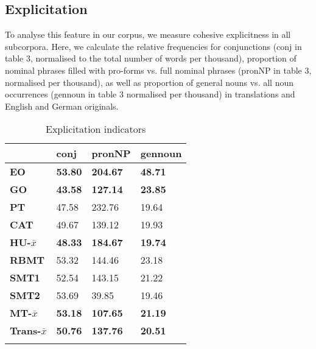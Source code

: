 \documentclass[output=paper]{LSP/langsci}
\begin{document}
\subsection{Explicitation}

To analyse this feature in our corpus, we measure cohesive explicitness in all subcorpora. Here, we calculate the relative frequencies for conjunctions (conj in table 3, normalised to the total number of words per thousand), proportion of nominal phrases filled with pro-forms vs. full nominal phrases (pronNP in table 3, normalised per thousand), as well as proportion of general nouns vs. all noun occurrences (gennoun in table 3 normalised per thousand) in translations and English and German originals.

\begin{table}
     \centering
     \begin{tabular}{llll}
\lsptoprule
              & \textbf{conj}         & \textbf{pronNP}  & \textbf{gennoun} \\ \midrule
\textbf{EO}    & \textbf{53.80}     & \textbf{204.67} & \textbf{48.71} \\ \midrule
\textbf{GO}    & \textbf{43.58}     & \textbf{127.14} & \textbf{23.85} \\ \midrule
\textbf{PT}    & 47.58		        & 232.76          & 19.64 \\
\textbf{CAT}   & 49.67		        & 139.12          & 19.93  \\ \midrule
\textbf{HU-$\bar{x}$}    & \textbf{48.33}     & \textbf{184.67}   & \textbf{19.74}\\ \midrule
\textbf{RBMT}  & 53.32		        & 144.46          & 23.18 \\
\textbf{SMT1}  & 52.54		        & 143.15          & 21.22 \\
\textbf{SMT2}  & 53.69		        & 39.85           & 19.46 \\ \midrule
\textbf{MT-$\bar{x}$} & \textbf{53.18}  & \textbf{107.65}  & \textbf{21.19} \\ \midrule
\textbf{Trans-$\bar{x}$} & \textbf{50.76}  & \textbf{137.76}  & \textbf{20.51} \\ 
\lspbottomrule
     \end{tabular}

 \caption{Explicitation indicators}
     \label{4.3}
\end{table}
\end{document}
